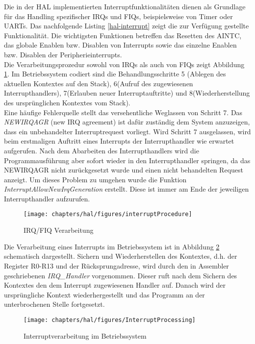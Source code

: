 Die in der HAL implementierten Interruptfunktionalitäten dienen als Grundlage für das Handling spezifischer IRQs und FIQs, beispielsweise von Timer oder UARTs. Das nachfolgende Listing \ref{hal-interrupt} zeigt die zur Verfügung gestellte Funktionalität. Die wichtigsten Funktionen betreffen das Resetten des AINTC, das globale Enablen bzw. Disablen von Interrupts sowie das einzelne Enablen bzw. Disablen der Peripherieinterrupts.\\



Die Verarbeitungsprozedur sowohl von IRQs als auch von FIQs zeigt Abbildung \ref{fig:interruptProcedure}. Im Betriebssystem codiert sind die Behandlungsschritte 5 (Ablegen des aktuellen Kontextes auf den Stack), 6(Aufruf des zugewiesenen Interrupthandlers), 7(Erlauben neuer Interruptauftritte) und 8(Wiederherstellung des ursprünglichen Kontextes vom Stack).\\

Eine häufige Fehlerquelle stellt das versehentliche Weglassen von Schritt 7. Das \emph{NEWIRQAGR} (new IRQ agreement) ist dafür zuständig dem System anzuzeigen, dass ein unbehandelter Interruptrequest vorliegt. Wird Schritt 7 ausgelassen, wird beim erstmaligen Auftritt eines Interrupts der Interrupthandler wie erwartet aufgerufen. Nach dem Abarbeiten des Interrupthandlers wird die Programmausführung aber sofort wieder in den Interrupthandler springen, da das NEWIRQAGR nicht zurückgesetzt wurde und einen nicht behandelten Request anzeigt. Um dieses Problem zu umgehen wurde die Funktion \emph{InterruptAllowNewIrqGeneration} erstellt. Diese ist immer am Ende der jeweiligen Interrupthandler aufzurufen.

\begin{figure}[H]
	\texttt{[image: chapters/hal/figures/interruptProcedure]}
	\caption{IRQ/FIQ Verarbeitung \cite[S. 193]{ARM:TRM}}
	\label{fig:interruptProcedure}
\end{figure}


Die Verarbeitung eines Interrupts im Betriebssystem ist in Abbildung \ref{fig:interruptProcessing} schematisch dargestellt. Sichern und Wiederherstellen des Kontextes, d.h. der Register R0-R13 und der Rücksprungadresse, wird durch den in Assembler geschriebenen \emph{IRQ\_Handler} vorgenommen. Dieser ruft nach dem Sichern des Kontextes den dem Interrupt zugewiesenen Handler auf. Danach wird der ursprüngliche Kontext wiederhergestellt und das Programm an der unterbrochenen Stelle fortgesetzt.


\begin{figure}[H]
	\texttt{[image: chapters/hal/figures/InterruptProcessing]}
	\caption{Interruptverarbeitung im Betriebssystem}
	\label{fig:interruptProcessing}
\end{figure}
\pagebreak 